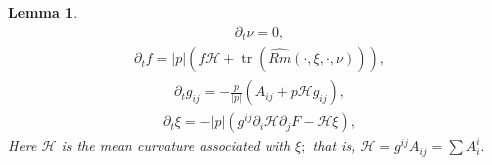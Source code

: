 \documentclass{amsart}
\newtheorem{lemma}[theorem]{Lemma}
\theoremstyle{definition}
\theoremstyle{remark}
\numberwithin{equation}{section}
\begin{document}
\begin{lemma}
\begin{align}
\partial_t\nu=0,
\end{align}
\begin{align}
\partial_t f =|p|(f\mathcal{H}+\operatorname{tr} (\widehat{Rm}(\cdot,\xi,\cdot,\nu))),
\end{align}
\begin{align}
\partial_tg_{ij}=-\frac{p}{|p|}( A _{ij}+p  \mathcal{H}g_{ij}),
\end{align}
\begin{align}
\partial_t\xi=- |p|(g^{ij}\partial_i\mathcal{H}\partial_jF- \mathcal{H}\xi),
\end{align}
Here $\mathcal{H}$ is the mean curvature associated with $\xi;$ that is, $\mathcal{H}=g^{ij} A _{ij}=\sum  A _i^i.$
\end{lemma}
\end{document}
